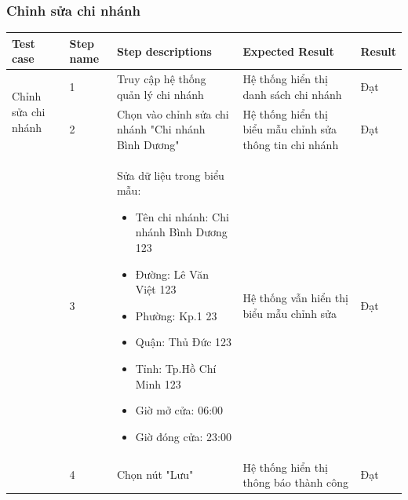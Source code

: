 \subsubsection{Chỉnh sửa chi nhánh}
{
    \setlength\extrarowheight{6pt}
    \begin{longtable}{| p{2.5cm}| p{1cm}| p{5.5cm}| p{4.5cm} | p{1.5cm} |}
        \hline
        \textbf{Test case}                              & \textbf{Step name}                           & \textbf{Step descriptions}                          & \textbf{Expected Result}                                 & \textbf{Result} \\
        \hline
        \multirow[t]{2}{2.5cm}{Chỉnh sửa chi nhánh}     & 1                                            & Truy cập hệ thống quản lý chi nhánh                 & Hệ thống hiển thị danh sách chi nhánh                    & Đạt             \\
        \cline{2-5}
                                                        & 2                                            & Chọn vào chỉnh sửa chi nhánh "Chi nhánh Bình Dương" & Hệ thống hiển thị biểu mẫu chỉnh sửa thông tin chi nhánh & Đạt             \\
        \cline{2-5}
                                                        & 3                                            & Sửa dữ liệu trong biểu mẫu:
        \begin{itemize}
            \item Tên chi nhánh: Chi nhánh Bình Dương 123
            \item Đường: Lê Văn Việt 123
            \item Phường: Kp.1 23
            \item Quận: Thủ Đức 123
            \item Tỉnh: Tp.Hồ Chí Minh 123
            \item Giờ mở cửa: 06:00
            \item Giờ đóng cửa: 23:00
        \end{itemize}   & Hệ thống vẫn hiển thị biểu mẫu chỉnh sửa     & Đạt                                                                                                                                                              \\
        \cline{2-5}
                                                        & 4                                            & Chọn nút "Lưu"                                      & Hệ thống hiển thị thông báo thành công                   & Đạt             \\

\end{longtable}}
